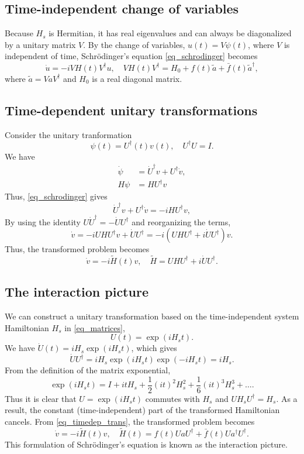 \documentclass[11pt]{article}
\begin{document}
\subsection{Time-independent change of variables}
Because $H_s$ is Hermitian, it has real eigenvalues and can always be diagonalized by a unitary
matrix $V$. By the change of variables, $u(t)=V \psi(t)$, where $V$ is independent of time, Schr\"odinger's equation
\eqref{eq_schrodinger} becomes
\[
\dot{u} = -i VH(t)V^\dag u,\quad VH(t)V^\dag = H_0 + f(t)\tilde{a} + \bar{f}(t)\tilde{a}^\dag,
\]
where $\tilde{a}=V a V^\dag$ and $H_0$ is a real diagonal matrix.

\subsection{Time-dependent unitary transformations}
Consider the unitary tranformation
\[
\psi(t) = U^{\dag}(t)v(t),\quad U^\dag U = I.
\]
We have
\begin{align*}
\dot{\psi} &= \dot{U}^\dag v + U^\dag \dot{v},\\
H\psi &= H U^\dag v
\end{align*}
Thus, \eqref{eq_schrodinger} gives
\[
\dot{U}^\dag v + U^\dag \dot{v} = -i H U^\dag v,
\]
By using the identity $U \dot{U}^\dag = - \dot{U} U^\dag$ and reorganizing the terms,
\[
\dot{v} = -i U H U^\dag v + \dot{U} U^\dag = -i\left( UHU^\dag + i \dot{U} U^\dag \right) v.
\]
Thus, the transformed problem becomes
\begin{equation}\label{eq_timedep_trans}
\dot{v} = -i \tilde{H}(t) v,\quad \tilde{H} = UHU^\dag + i \dot{U} U^\dag.
\end{equation}

\subsection{The interaction picture}

We can construct a unitary transformation based on the time-independent system Hamiltonian $H_s$ in
\eqref{eq_matrices},
\[
U(t) = \exp(i H_s t).
\]
We have $\dot{U}(t) = i H_s \exp(i H_s t)$, which gives
\[
\dot{U}U^\dag =  i H_s \exp(i H_s t) \exp(- i H_s t) = i H_s.
\]
From the definition of the matrix exponential,
\[
\exp(i H_s t) = I + it H_s + \frac{1}{2} (it)^2 H_s^2 + \frac{1}{6} (it)^3 H_s^3 + \ldots.
\]
Thus it is clear that $U=\exp(i H_s t)$ commutes with $H_s$ and $UH_sU^\dag = H_s$. As a result, the
constant (time-independent) part of the transformed Hamiltonian cancels. From
\eqref{eq_timedep_trans}, the transformed problem becomes
\begin{equation}\label{eq_interaction}
  \dot{v} = -i \tilde{H}(t) v,\quad  \tilde{H}(t) = f(t) UaU^\dag + \bar{f}(t) Ua^\dag U^\dag.
\end{equation}
This formulation of Schr\"odinger's equation is known as the interaction picture.
\end{document}
